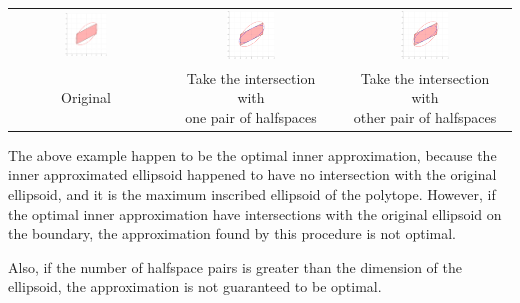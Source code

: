 \documentclass{article}
\begin{document}
\begin{table}[H]
	\centering
	\begin{tabular}{ccc}
		\includegraphics[width=0.3\textwidth]{polytope_intersect/4.pdf} & \includegraphics[width=0.3\textwidth]{polytope_intersect/5.pdf} & \includegraphics[width=0.3\textwidth]{polytope_intersect/6.pdf}\\
		Original & \makecell{Take the intersection with \\ one pair of halfspaces} & \makecell{Take the intersection with \\ other pair of halfspaces}
	\end{tabular}
	\label{polytope_intersect2}
\end{table}

The above example happen to be the optimal inner approximation, because the inner approximated ellipsoid happened to have no intersection with the original ellipsoid, and it is the maximum inscribed ellipsoid of the polytope. However, if the optimal inner approximation have intersections with the original ellipsoid on the boundary, the approximation found by this procedure is not optimal.

Also, if the number of halfspace pairs is greater than the dimension of the ellipsoid, the approximation is not guaranteed to be optimal.
\end{document}
